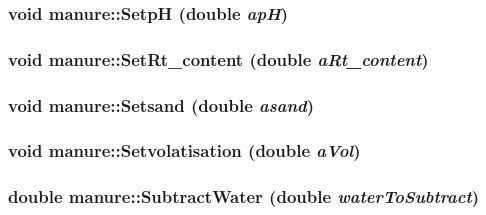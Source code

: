 \label{classmanure_ab92a739f5a35221e48c8923af884e3a4}
\hypertarget{classmanure_a6d4583c874bb537909cfe6c110a59041}{
\subsubsection[{SetpH}]{\setlength{\rightskip}{0pt plus 5cm}void manure::SetpH (double {\em apH})}}
\label{classmanure_a6d4583c874bb537909cfe6c110a59041}
\hypertarget{classmanure_a7fb7695584fe22855f7b1183a97d26d2}{
\subsubsection[{SetRt\_\-content}]{\setlength{\rightskip}{0pt plus 5cm}void manure::SetRt\_\-content (double {\em aRt\_\-content})}}
\label{classmanure_a7fb7695584fe22855f7b1183a97d26d2}
\hypertarget{classmanure_a3a698b8d4b52c4fd14b7731ce20ad57d}{
\subsubsection[{Setsand}]{\setlength{\rightskip}{0pt plus 5cm}void manure::Setsand (double {\em asand})}}
\label{classmanure_a3a698b8d4b52c4fd14b7731ce20ad57d}
\hypertarget{classmanure_adefe5e150b1de5ae3c4af36c0c6dcada}{
\subsubsection[{Setvolatisation}]{\setlength{\rightskip}{0pt plus 5cm}void manure::Setvolatisation (double {\em aVol})}}
\label{classmanure_adefe5e150b1de5ae3c4af36c0c6dcada}
\hypertarget{classmanure_a1bfcf202c765d99c51fb8ed6850e21a2}{
\subsubsection[{SubtractWater}]{\setlength{\rightskip}{0pt plus 5cm}double manure::SubtractWater (double {\em waterToSubtract})}}
\label{classmanure_a1bfcf202c765d99c51fb8ed6850e21a2}


